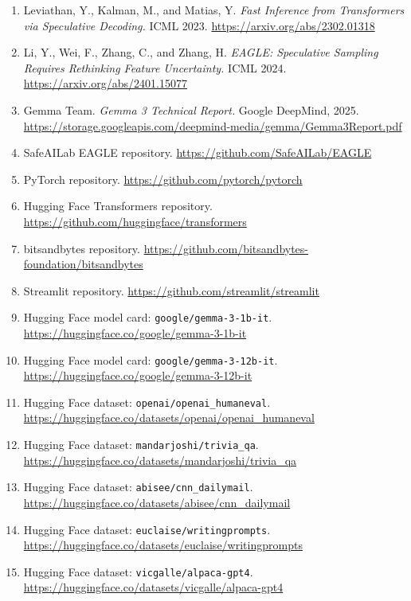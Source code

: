 \documentclass[
]{article}
\begin{document}
\begin{enumerate}
\def\labelenumi{\arabic{enumi}.}
\item
  Leviathan, Y., Kalman, M., and Matias, Y. \emph{Fast Inference from
  Transformers via Speculative Decoding.} ICML 2023.
  \url{https://arxiv.org/abs/2302.01318}
\item
  Li, Y., Wei, F., Zhang, C., and Zhang, H. \emph{EAGLE: Speculative
  Sampling Requires Rethinking Feature Uncertainty.} ICML 2024.
  \url{https://arxiv.org/abs/2401.15077}
\item
  Gemma Team. \emph{Gemma 3 Technical Report.} Google DeepMind, 2025.
  \url{https://storage.googleapis.com/deepmind-media/gemma/Gemma3Report.pdf}
\item
  SafeAILab EAGLE repository. \url{https://github.com/SafeAILab/EAGLE}
\item
  PyTorch repository. \url{https://github.com/pytorch/pytorch}
\item
  Hugging Face Transformers repository.
  \url{https://github.com/huggingface/transformers}
\item
  bitsandbytes repository.
  \url{https://github.com/bitsandbytes-foundation/bitsandbytes}
\item
  Streamlit repository. \url{https://github.com/streamlit/streamlit}
\item
  Hugging Face model card: \texttt{google/gemma-3-1b-it}.
  \url{https://huggingface.co/google/gemma-3-1b-it}
\item
  Hugging Face model card: \texttt{google/gemma-3-12b-it}.
  \url{https://huggingface.co/google/gemma-3-12b-it}
\item
  Hugging Face dataset: \texttt{openai/openai\_humaneval}.
  \url{https://huggingface.co/datasets/openai/openai_humaneval}
\item
  Hugging Face dataset: \texttt{mandarjoshi/trivia\_qa}.
  \url{https://huggingface.co/datasets/mandarjoshi/trivia_qa}
\item
  Hugging Face dataset: \texttt{abisee/cnn\_dailymail}.
  \url{https://huggingface.co/datasets/abisee/cnn_dailymail}
\item
  Hugging Face dataset: \texttt{euclaise/writingprompts}.
  \url{https://huggingface.co/datasets/euclaise/writingprompts}
\item
  Hugging Face dataset: \texttt{vicgalle/alpaca-gpt4}.
  \url{https://huggingface.co/datasets/vicgalle/alpaca-gpt4}
\end{enumerate}
\end{document}
